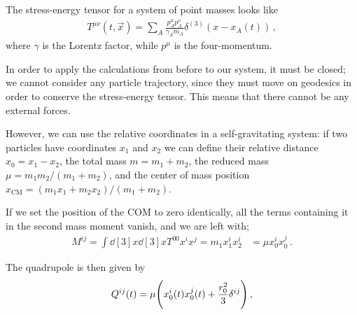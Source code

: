 \documentclass[main.tex]{subfiles}
\begin{document}
The stress-energy tensor for a system of point masses looks like 
%
\begin{align}
T^{\mu \nu }(t, \vec{x}) = \sum _{A} \frac{p^{\mu }_{A} p^{\nu }_{A}}{\gamma_{A}  m_{A}} \delta^{(3)} (x - x_{A}(t))
\,,
\end{align}
%
where \(\gamma \) is the Lorentz factor, while \(p^{\mu }\) is the four-momentum.  

In order to apply the calculations from before to our system, it must be closed; we cannot consider any particle trajectory, since they must move on geodesics in order to conserve the stress-energy tensor. This means that there cannot be any external forces. 

However, we can use the relative coordinates in a self-gravitating system: if two particles have coordinates \(x_1\) and \(x_2\) we can define their relative distance \(x_0 = x_1 - x_2 \), the total mass \(m = m_1 + m_2 \), the reduced mass \(\mu = m_1 m_2 / (m_1 + m_2 )\), and the center of mass position \(x _{\text{CM}} = (m_1 x_1 +m_2 x_2 ) / (m_1 + m_2 )\). 

If we set the position of the COM to zero identically, all the terms containing it in the second mass moment vanish, and we are left with;
%
\begin{align}
M^{ij} = \int \dd[3]{x} \dd[3]{x} T^{00} x^{i}x^{j} = m_1 x^{i}_{1} x^{i}_{2}
&= \mu x^{i}_{0} x^{j}_{0}
\,.
\end{align}

The quadrupole is then given by 
%
\begin{align}
Q^{ij} (t) = \mu \qty(x^{i}_{0} (t)x^{j}_{0} (t) + \frac{r_0^2}{3} \delta^{ij})
\,,
\end{align}
\end{document}
